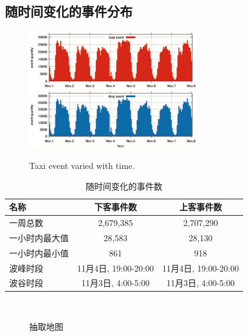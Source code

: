 \subsection{随时间变化的事件分布}


\begin{figure}[ht]
\centering
\includegraphics[width=0.65\textwidth]{figures/analysis/event_w_time.eps}\\
\caption{Taxi event varied with time.}\label{figure_event_varied_w_t}
\end{figure}



\begin{table}[ht]
\caption{随时间变化的事件数}\label{table_event_distribution_with_time}
\centering
\begin{tabular}{l|c|c}
 \hline
 名称 & 下客事件数 & 上客事件数 \\
  \hline
  一周总数& 2,679,385&2,707,290\\
  一小时内最大值&28,583 &28,130\\
  一小时内最小值&861&918\\
  波峰时段&11月4日, 19:00-20:00&11月4日, 19:00-20:00\\
  波谷时段&11月3日, 4:00-5:00&11月3日, 4:00-5:00\\
  \hline
  \end{tabular}
\end{table}




\begin{figure}[ht]
\centering
{}\\
\caption{抽取地图}\label{figure_map}
\end{figure}


